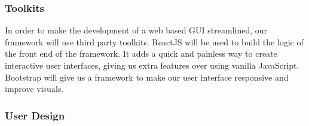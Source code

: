 
\subsubsection{Toolkits}
In order to make the development of a web based GUI streamlined, our framework will use third party toolkits. ReactJS will be used to build the logic of the front end of the framework. It adds a quick and painless way to create interactive user interfaces, giving us extra features over using vanilla JavaScript. Bootstrap will give us a framework to make our user interface responsive and improve visuals.

\subsubsection{User Design}
